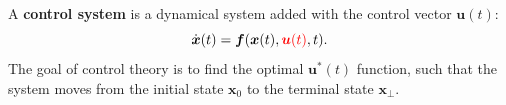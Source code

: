\documentclass[orivec]{llncs}
\makeatletter
\newcommand{\emp}[1]{\textbf{#1}}
\newcommand{\vect}[1]{\boldsymbol{#1}}
\renewcommand{\boxed}[1]{\fbox{\m@th$\displaystyle\scalebox{0.9}{#1}$} \,}
\makeatother
\begin{document}
A \emp{control system} is a dynamical system added with the control vector $\vect{u}(t)$:
\begin{equation}
\label{eqn:control-rule}
\dot{\vect{x}}(t) = \vect{f}(\vect{x}(t), {\color{red} \vect{u}(t)}, t) .
\end{equation}
The goal of control theory is to find the optimal $\vect{u}^*(t)$ function, such that the system moves from the initial state $\vect{x}_0$ to the terminal state $\vect{x_\bot}$.

\end{document}
